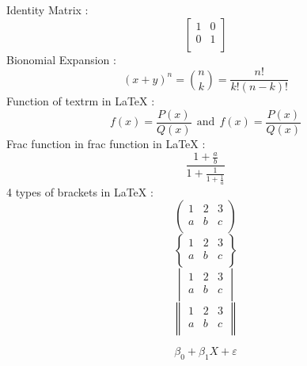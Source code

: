 \documentclass{article}[12pt]
\begin{document}
Identity Matrix :
\[
\begin{bmatrix}
    1 & 0 \\
    0 & 1 \\
\end{bmatrix}
\]
Bionomial Expansion :
\[
 (x +y)^{n} = \binom{n}{k} = \frac{n!}{k!(n-k)!}
\]
Function of textrm in LaTeX :
\[ f(x)=\frac{P(x)}{Q(x)} \ \ \textrm{and}
\ \ f(x)=\textstyle\frac{P(x)}{Q(x)} \]
Frac function in frac function in LaTeX :
\[ \frac{1+\frac{a}{b}}{1+\frac{1}{1+\frac{1}{a}}} \]
4 types of brackets in LaTeX :
\[
\begin{pmatrix}
1 & 2 & 3\\
a & b & c\\
\end{pmatrix}
\]
\[
\begin{Bmatrix}
1 & 2 & 3\\
a & b & c\\
\end{Bmatrix}
\]
\[
\begin{vmatrix}
1 & 2 & 3\\
a & b & c\\
\end{vmatrix}
\]
\[
\begin{Vmatrix}
1 & 2 & 3\\
a & b & c\\
\end{Vmatrix}
\]

\[
\beta_{0} + \beta_{1}X + \varepsilon
\]
\end{document}

